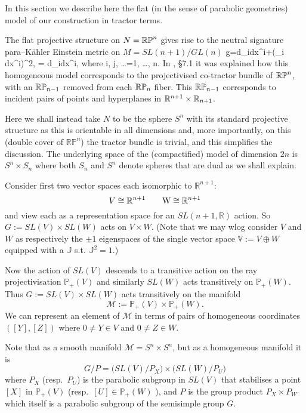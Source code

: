 In this section we describe here the flat (in the sense of parabolic
geometries) model \cite{CDT13, DM} of our construction in tractor
terms.

The flat projective structure on $N=\mathbb{RP}^n$ gives rise to 
the neutral signature para--K\"ahler Einstein metric on $M=SL(n+1)/GL(n)$
\be
\label{DM_metric}
g=d\xi_i\odot dx^i+(\xi_i dx^i)^2, \quad \Omega= d\xi_i\wedge dx^i, \quad\mbox{where}\quad
i, j, \dots =1, \dots, n.
\ee
In \cite{DM}, \S 7.1 it was explained how this homogeneous model
corresponds to the projectivised co-tractor bundle of $\mathbb{RP}^n$, with
an $\mathbb{RP}_{n-1}$ removed from each $\mathbb{RP}_n$ fiber. This $\mathbb{RP}_{n-1}$
corresponds to incident pairs of points and hyperplanes in $\mathbb{R}^{n+1}\times\mathbb{R}_{n+1}$.


Here we shall instead take $N$ to be the sphere $S^n$ with its standard
projective structure as this is orientable in all dimensions and, more
importantly, on this (double cover of $\mathbb{R}\mathbb{P}^n$) the
tractor bundle is trivial, and this simplifies the discussion.  The
underlying space of the (compactified) model of dimension $2n$ is
$S^n\times S_n$ where both $S_n$ and $S^n$ denote spheres that are
dual as we shall explain.

Consider first two vector spaces each isomorphic to $\mathbb{R}^{n+1}$:
$$
V\cong \mathbb{R}^{n+1} \qquad \mbox W \cong \mathbb{R}^{n+1}
$$
and view each as a representation space for an $SL(n+1,\mathbb{R})$
action.  So $G:= SL(V)\times SL(W)$ acts on $V\times W$. (Note that we may
wlog consider $V$ and $W$ as respectively the $\pm 1$ eigenspaces of
the single vector space $\mathbb{V}:=V\oplus W$ equipped with a
$\mathbb{J}$ s.t. $\mathbb{J}^2=1$.)

Now the action of $SL(V)$ descends to a transitive action on the ray
projectivisation $\mathbb{P}_+(V)$ and similarly $SL(W)$ acts
transitively on $\mathbb{P}_+(W)$. Thus  $G:= SL(V)\times SL(W)$ acts transitively on the manifold
$$
{\mathcal M}:= \mathbb{P}_+(V) \times \mathbb{P}_+(W).
$$
We can represent an element of $\mathcal{M}$ in terms of pairs of homogeneous coordinates
$([Y],[Z])$ where $0\neq Y\in V$ and $0\neq Z\in W$.

Note that as a smooth manifold $\mathcal{M}=S^n\times S^n$, but as a homogeneous manifold it is
$$
G/P = \big( SL(V)/P_X \big)\times \big( SL(W)/P_U \big)
$$
where $P_X$ (resp.\ $P_U$) is the parabolic subgroup in $SL(V)$
that stabilises a point $[X]$ in $\mathbb{P}_+(V)$ (resp.\ $[U] \in \mathbb{P}_+(W)$
), and $P$ is the group product $P_X\times P_W$ which itself is a
parabolic subgroup of the semisimple group $G$.

